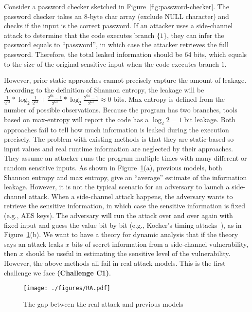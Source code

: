 Consider a password checker sketched in Figure~\ref{fig:password-checker}.
The password checker takes an 8-byte char array (exclude \textsf{NULL} character) 
and checks if the input is the correct password. If an attacker uses a side-channel attack to determine that the code executes branch
$\{{1\}}$, they can infer the password equals to
``password'', in which case the attacker retrieves the full password.
Therefore, the total leaked information should be 64 bits, which equals to the
size of the original sensitive input when the code executes branch
$1$.

However, prior static approaches cannot precisely capture the amount of leakage. According to the definition of Shannon entropy, the leakage will be
$\frac{1}{2^{64}}*\log_{2}\frac{1}{2^{64}} + \frac{2^{64}-1}{2^{64}}
*\log_{2}\frac{2^{64}-1}{2^{64}} \approx 0$ bits. Max-entropy is defined from the
number of possible observations. Because the program has two
branches, tools based on max-entropy will report the code has a $\log_2{2} = 1$
bit leakage.
Both approaches fail to tell how much information is leaked during the execution
precisely. The problem with existing methods is that they are static-based so
input values and real runtime information are neglected by their approaches. 
They assume an attacker runs
the program multiple times with many different or random sensitive inputs. As
shown in Figure~\ref{fig:gap}(a), previous models, both Shannon entropy and max
entropy, give an ``average'' estimate of the information leakage. However, it is
not the typical scenario for an adversary to launch a side-channel attack. When
a side-channel attack happens, the adversary wants to retrieve the sensitive
information, in which case the sensitive information is fixed (e.g., AES keys).
The adversary will run the attack over and over again with fixed input and 
guess the value bit by
bit (e.g., Kocher's timing attacks~\cite{kocher1996timing}), as in Figure~\ref{fig:gap}(b). We want to have a
theory for dynamic analysis that if the theory says an attack leaks $x$ bits of
secret information from a side-channel vulnerability, then $x$ should be useful
in estimating the sensitive level of the vulnerability. However, the above
methods all fail in real attack models. This is the first challenge we face
\textbf{(Challenge C1)}.

\begin{figure}
    \centering
    \texttt{[image: ./figures/RA.pdf]}
\vspace*{-6pt}
    \caption{The gap between the real attack and previous models}\label{fig:gap}
\end{figure}

